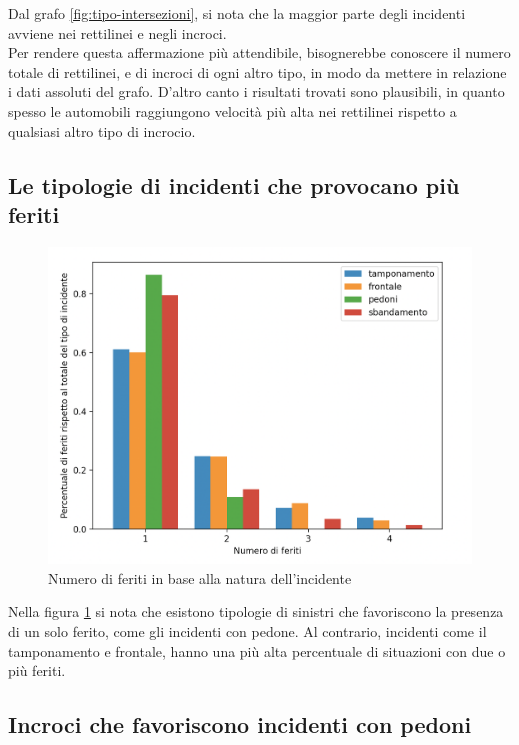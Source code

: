 \documentclass[a4paper]{report}
\begin{document}
Dal grafo \ref{fig:tipo-intersezioni}, 
si nota che la maggior parte degli incidenti avviene nei rettilinei e negli incroci.\\
Per rendere questa affermazione più attendibile, 
bisognerebbe conoscere il numero totale di rettilinei, e di incroci di ogni altro tipo, in 
modo da mettere in relazione i dati assoluti del grafo. 
D'altro canto i risultati trovati sono plausibili, in quanto spesso le automobili raggiungono 
velocità più alta nei rettilinei rispetto a qualsiasi altro tipo di incrocio.


\subsection{Le tipologie di incidenti che provocano più feriti}

\begin{figure}
    \includegraphics[width=\linewidth]{../src/incidenti/incidenti_senza_coords/natura_incidente/numero_feriti.png}
    \caption{Numero di feriti in base alla natura dell'incidente}
    \label{fig:numero-feriti}
\end{figure}

Nella figura \ref{fig:numero-feriti} si nota che esistono tipologie di sinistri che 
favoriscono la presenza di un solo ferito, come gli incidenti con pedone. 
Al contrario, incidenti come il tamponamento e frontale, 
hanno una più alta percentuale di situazioni con due o più feriti.

\subsection{Incroci che favoriscono incidenti con pedoni}
\end{document}
